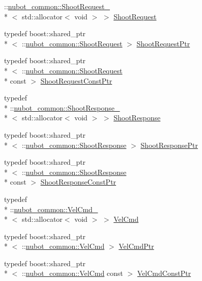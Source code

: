 \begin{DoxyCompactItemize}
\-::\hyperlink{structnubot__common_1_1ShootRequest__}{nubot\-\_\-common\-::\-Shoot\-Request\-\_\-}\\*
$<$ std\-::allocator$<$ void $>$ $>$ \hyperlink{namespacenubot__common_ae80d20ffb44fb7b8c15ae5efb75aed2a}{Shoot\-Request}
\item 
typedef boost\-::shared\-\_\-ptr\\*
$<$ \-::\hyperlink{namespacenubot__common_ae80d20ffb44fb7b8c15ae5efb75aed2a}{nubot\-\_\-common\-::\-Shoot\-Request} $>$ \hyperlink{namespacenubot__common_ac26df14be5ca8158accd2be7a5532c3f}{Shoot\-Request\-Ptr}
\item 
typedef boost\-::shared\-\_\-ptr\\*
$<$ \-::\hyperlink{namespacenubot__common_ae80d20ffb44fb7b8c15ae5efb75aed2a}{nubot\-\_\-common\-::\-Shoot\-Request} \\*
const  $>$ \hyperlink{namespacenubot__common_a4e7d92f32252327a6f204aa31bbf5edf}{Shoot\-Request\-Const\-Ptr}
\item 
typedef \\*
\-::\hyperlink{structnubot__common_1_1ShootResponse__}{nubot\-\_\-common\-::\-Shoot\-Response\-\_\-}\\*
$<$ std\-::allocator$<$ void $>$ $>$ \hyperlink{namespacenubot__common_a1561f4f368f1842d112eda1c185772d4}{Shoot\-Response}
\item 
typedef boost\-::shared\-\_\-ptr\\*
$<$ \-::\hyperlink{namespacenubot__common_a1561f4f368f1842d112eda1c185772d4}{nubot\-\_\-common\-::\-Shoot\-Response} $>$ \hyperlink{namespacenubot__common_a93dfc1246b6d9c0f280764c96dd91d06}{Shoot\-Response\-Ptr}
\item 
typedef boost\-::shared\-\_\-ptr\\*
$<$ \-::\hyperlink{namespacenubot__common_a1561f4f368f1842d112eda1c185772d4}{nubot\-\_\-common\-::\-Shoot\-Response} \\*
const  $>$ \hyperlink{namespacenubot__common_a7b99346b603c3c2c580db63c98d0f816}{Shoot\-Response\-Const\-Ptr}
\item 
typedef \\*
\-::\hyperlink{structnubot__common_1_1VelCmd__}{nubot\-\_\-common\-::\-Vel\-Cmd\-\_\-}\\*
$<$ std\-::allocator$<$ void $>$ $>$ \hyperlink{namespacenubot__common_a7dcbb6e0f9d7827fd3a4c5b347ae3cfa}{Vel\-Cmd}
\item 
typedef boost\-::shared\-\_\-ptr\\*
$<$ \-::\hyperlink{namespacenubot__common_a7dcbb6e0f9d7827fd3a4c5b347ae3cfa}{nubot\-\_\-common\-::\-Vel\-Cmd} $>$ \hyperlink{namespacenubot__common_ab8f33f5e88e6ab7d9002f4eeb9d638db}{Vel\-Cmd\-Ptr}
\item 
typedef boost\-::shared\-\_\-ptr\\*
$<$ \-::\hyperlink{namespacenubot__common_a7dcbb6e0f9d7827fd3a4c5b347ae3cfa}{nubot\-\_\-common\-::\-Vel\-Cmd} const  $>$ \hyperlink{namespacenubot__common_a8cb6ca1f6040766fed7e93b076a46233}{Vel\-Cmd\-Const\-Ptr}
\end{DoxyCompactItemize}
